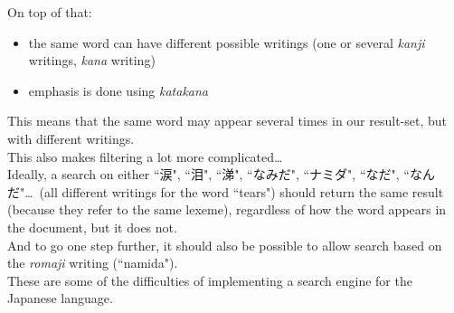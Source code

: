 \bigskip

On top of that:

\begin{itemize}
	\item the same word can have different possible writings (one or several \emph{kanji} writings, \emph{kana} writing)
	
	\item emphasis is done using \emph{katakana}
\end{itemize}

This means that the same word may appear several times in our result-set, but with different writings. \\

This also makes filtering a lot more complicated\dots \\

Ideally, a search on either ``涙", ``泪", ``涕", ``なみだ", ``ナミダ", ``なだ", ``なんだ"\dots\  (all different writings for the word ``tears") should return the same result (because they refer to the same lexeme), regardless of how the word appears in the document, but it does not. \\

And to go one step further, it should also be possible to allow search based on the \emph{romaji} writing (``namida"). \\



These are some of the difficulties of implementing a search engine for the Japanese language. \\
